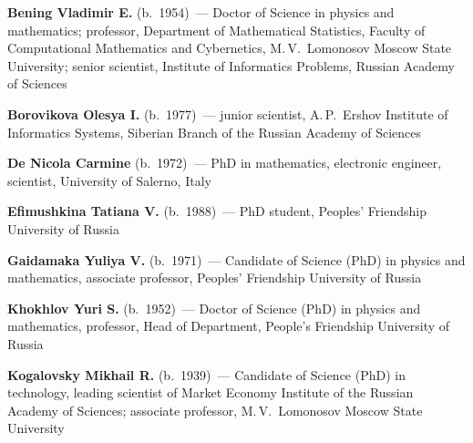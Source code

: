 \begin{multicols}{2}


\noindent
\textbf{Bening Vladimir E.} (b.\ 1954)~--- Doctor of Science in physics 
and mathematics; professor, Department of Mathematical Statistics, 
Faculty of Computational Mathematics and Cybernetics, 
M.\,V.~Lomonosov Moscow State University; senior scientist, 
Institute of Informatics Problems, Russian Academy of Sciences

\vspace*{4pt}

\noindent
\textbf{Borovikova Olesya I.}  (b.\ 1977)~--- junior scientist, A.\,P.~Ershov Institute of 
Informatics Systems, Siberian Branch of the Russian Academy of Sciences

\vspace*{4pt}

\noindent
\textbf{De Nicola Carmine} (b.\ 1972)~--- PhD in mathematics, electronic engineer, 
scientist, University of Salerno, Italy

\vspace*{4pt}

\noindent
\textbf{Efimushkina Tatiana V.} (b.\ 1988)~--- PhD student, Peoples' Friendship University of Russia

\vspace*{4pt}

\noindent
\textbf{Gaidamaka Yuliya V.} (b.\ 1971)~--- Candidate of Science (PhD) in physics and 
mathematics, associate professor, Peoples' Friendship University of Russia



\vspace*{4pt}

\noindent
\textbf{Khokhlov Yuri S.} (b.\ 1952)~--- Doctor of Science (PhD) in physics and mathematics, 
professor, Head of Department, People's Friendship University of
Russia

\vspace*{4pt}

\noindent
\textbf{Kogalovsky Mikhail R.} (b.\ 1939)~--- Candidate of Science (PhD) in technology,
leading scientist of Market Economy Institute of the Russian Academy of Sciences;
associate professor, M.\,V.~Lomonosov Moscow State University


\end{multicols}
